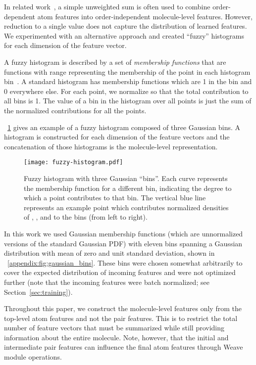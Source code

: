 In related work~\citep{merkwirth2005automatic,
duvenaud2015convolutional, lusci2013deep}, a simple unweighted sum is
often used to combine order-dependent atom features into order-independent
molecule-level features. However, reduction to a single value does not capture
the distribution of learned features. We experimented with an alternative
approach and created ``fuzzy'' histograms for each dimension of the feature
vector.

A fuzzy histogram is described by a set of \emph{membership functions} that are
functions with range  representing the membership of the point in each
histogram bin~\citep{zadeh1965fuzzy}. A standard histogram has membership functions which
are 1 in the bin and 0 everywhere else. For each point, we normalize so that the
total contribution to all bins is 1. The value of a bin in the histogram over
all points is just the sum of the normalized contributions for all the points.

\figurename~\ref{fig:fuzzy_histogram} gives an example of a fuzzy histogram
composed of three Gaussian bins. A histogram is constructed for each dimension
of the feature vectors and the concatenation of those histograms is the
molecule-level representation.

\begin{figure}[tb]
\centering
  \texttt{[image: fuzzy-histogram.pdf]}
  \caption{
    Fuzzy histogram with three Gaussian ``bins''. Each curve represents the
    membership function for a different bin, indicating the degree to which a
    point contributes to that bin. The vertical blue line represents an example
    point which contributes normalized densities of , , and
     to the bins (from left to right).
  }
  \label{fig:fuzzy_histogram}
\end{figure}

In this work we used Gaussian membership functions (which are unnormalized
versions of the standard Gaussian PDF) with eleven bins spanning a Gaussian
distribution with mean of zero and unit standard deviation, shown in
\figurename~\ref{appendix:fig:gaussian_bins}. These bins were chosen somewhat arbitrarily to cover the
expected distribution of incoming features and were not optimized further (note
that the incoming features were batch normalized; see
Section~\ref{sec:training}).

Throughout this paper, we construct the molecule-level features only from the
top-level atom features and not the pair features. This is to restrict the total
number of feature vectors that must be summarized while still providing
information about the entire molecule. Note, however, that the initial and
intermediate pair features can influence the final atom features through Weave
module operations.

